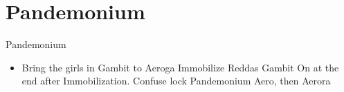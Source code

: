 \chapter{Pandemonium}

\begin{battle}{Pandemonium}
\begin{itemize}
\item Bring the girls in
\ashef Gambit to Aeroga
\penelof Immobilize Reddas
\ashef Gambit On at the end after Immobilization.
\vaanf Confuse lock Pandemonium
\penelof Aero, then Aerora
\end{itemize}
\end{battle}